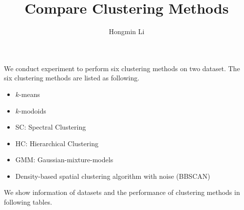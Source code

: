 \documentclass[a4paper,10pt]{article}
\begin{document}
    \title{Compare Clustering Methods}
    \maketitle
    \begin{center}
        \author{Hongmin Li}
    \end{center}

    We conduct experiment to perform six clustering methods on two dataset.
    The six clustering methods are listed as following.
    \begin{itemize}
        \item $k$-means
        \item $k$-modoids
        \item SC: Spectral Clustering
        \item HC: Hierarchical Clustering
        \item GMM: Gaussian-mixture-models
        \item Density-based spatial clustering algorithm with noise (BBSCAN)
    \end{itemize}
    
    We show information of datasets and the performance of clustering methods in following tables.

    \begin{center}

            
            
            
            
    \end{center}
    
\end{document}
